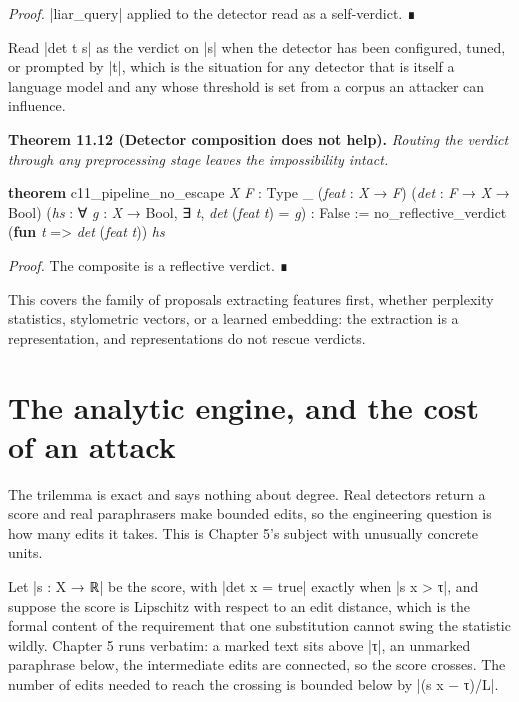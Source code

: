 \documentclass{memoir}
\begin{document}
\emph{Proof.} \LeanVerb|liar_query| applied to the detector read as a self-verdict. ∎

Read \LeanVerb|det t s| as the verdict on \LeanVerb|s| when the detector has been configured,
tuned, or prompted by \LeanVerb|t|, which is the situation for any detector that is
itself a language model and any whose threshold is set from a corpus an attacker
can influence.

\textbf{Theorem 11.12 (Detector composition does not help).} \emph{Routing the verdict
through any preprocessing stage leaves the impossibility intact.}

\begin{LeanVerbatim}
\textbf{theorem} c11_pipeline_no_escape \textit{X} \textit{F} : Type _
    (\textit{feat} : \textit{X} → \textit{F}) (\textit{det} : \textit{F} → \textit{X} → Bool)
    (\textit{hs} : ∀ \textit{g} : \textit{X} → Bool, ∃ \textit{t}, \textit{det} (\textit{feat} \textit{t}) = \textit{g}) : False :=
  no_reflective_verdict (\textbf{fun} \textit{t} => \textit{det} (\textit{feat} \textit{t})) \textit{hs}

\end{LeanVerbatim}


\emph{Proof.} The composite is a reflective verdict. ∎

This covers the family of proposals extracting features first, whether
perplexity statistics, stylometric vectors, or a learned embedding: the
extraction is a representation, and representations do not rescue verdicts.



\section{The analytic engine, and the cost of an attack}\label{Two--Schemas--of--Impossibility-005F-005F-005F--Machine--Checked--Limits--of--Trustworthy--Machine--Learning-005F-005F-005F--and--Why--They--Tighten--with--Capability----Watermarks-005F-005F-005F--Paraphrase-005F-005F-005F--and--the--Third--Corner----The--analytic--engine-005F-005F-005F--and--the--cost--of--an--attack}

The trilemma is exact and says nothing about degree. Real detectors return a
score and real paraphrasers make bounded edits, so the engineering question is
how many edits it takes. This is Chapter 5's subject with unusually concrete
units.

Let \LeanVerb|s : X → ℝ| be the score, with \LeanVerb|det x = true| exactly when \LeanVerb|s x > τ|, and
suppose the score is Lipschitz with respect to an edit distance, which is the
formal content of the requirement that one substitution cannot swing the
statistic wildly. Chapter 5 runs verbatim: a marked text sits above \LeanVerb|τ|, an
unmarked paraphrase below, the intermediate edits are connected, so the score
crosses. The number of edits needed to reach the crossing is bounded below by
\LeanVerb|(s x − τ)/L|.
\end{document}
